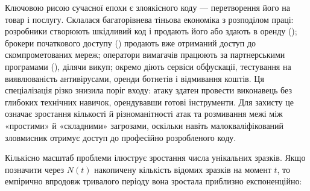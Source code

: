\begin{tikzfig}
\end{tikzfig}

Ключовою рисою сучасної епохи є  злоякісного коду --- перетворення його на товар і послугу. Склалася багаторівнева тіньова економіка з розподілом праці: розробники створюють шкідливий код і продають його або здають в оренду (); брокери початкового доступу () продають вже отриманий доступ до скомпрометованих мереж; оператори вимагачів працюють за партнерськими програмами (), ділячи викуп; окремо діють сервіси обфускації, тестування на виявлюваність антивірусами, оренди ботнетів і відмивання коштів. Ця спеціалізація різко знизила поріг входу: атаку здатен провести виконавець без глибоких технічних навичок, орендувавши готові інструменти. Для захисту це означає зростання кількості й різноманітності атак та розмивання межі між «простими» й «складними» загрозами, оскільки навіть малокваліфікований зловмисник отримує доступ до професійно розробленого коду.

Кількісно масштаб проблеми ілюструє зростання числа унікальних зразків. Якщо позначити через $N(t)$ накопичену кількість відомих зразків на момент $t$, то емпірично впродовж тривалого періоду вона зростала приблизно експоненційно:

